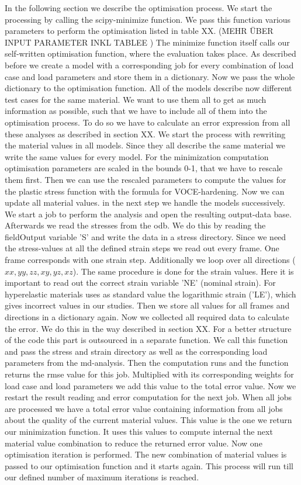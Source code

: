 In the following section we describe the optimisation process. We start the processing by calling the scipy-minimize function. We pass this function various parameters to perform the optimisation listed in table XX. (MEHR ÜBER INPUT PARAMETER INKL TABLEE ) The minimize function itself calls our self-written optimisation function, where the evaluation takes place. As described before we create a model with a corresponding job for every combination of load case and load parameters and store them in a dictionary. Now we pass the whole dictionary to the optimisation function. All of the models describe now different test cases for the same material. We want to use them all to get as much information as possible, such that we have to include all of them into the optimisation process. To do so we have to calculate an error expression from all these analyses as described in section XX. 
We start the process with rewriting the material values in all models. Since they all describe the same material we write the same values for every model. For the minimization computation optimisation parameters are scaled in the bounds 0-1, that we have to rescale them first. Then we can use the rescaled parameters to compute the values for the plastic stress function with the formula for VOCE-hardening. Now we can update all material values. in the next step we handle the models successively. We start a job to perform the  analysis and open the resulting output-data base. Afterwards we read the stresses from the odb. We do this by reading the fieldOutput variable 'S' and write the data in a stress directory. Since we need the stress-values at all the defined strain steps we read out every frame. One frame corresponds with one strain step. Additionally we loop over all directions ($xx, yy, zz, xy, yz, xz$). The same procedure is done for the strain values. Here it is important to read out the correct strain variable 'NE' (nominal strain). For hyperelastic materials  uses as standard value the logarithmic strain ('LE'), which gives incorrect values in our studies. Then we store all values for all frames and directions in a dictionary again. Now we collected all required data to calculate the error. We do this in the way described in section XX. For a better structure of the code this part is outsourced in a separate function. We call this function and pass the stress and strain directory as well as the corresponding load parameters from the md-analysis. Then the computation runs and the function returns the rmse value for this job. Multiplied with its corresponding weights for load case and load parameters we add this value to the total error value. Now we restart the result reading and error computation for the next job. When all jobs are processed we have a total error value containing information from all jobs about the quality of the current material values. This value is the one we return our minimization function. It uses this values to compute internal the next material value combination to reduce the returned error value. Now one optimisation iteration is performed. The new combination of material values is passed to our optimisation function and it starts again. This process will run till our defined number of maximum iterations is reached. 

